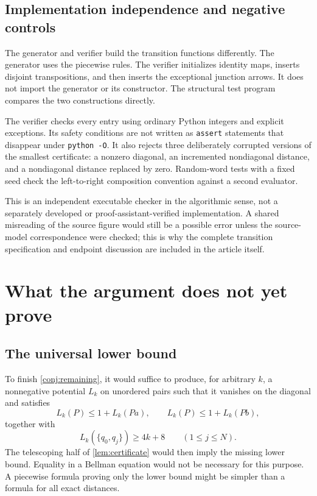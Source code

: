 \documentclass[11pt,a4paper]{article}
\numberwithin{equation}{section}
\theoremstyle{definition}
\theoremstyle{remark}
\begin{document}
\subsection{Implementation independence and negative controls}

The generator and verifier build the transition functions differently.
The generator uses the piecewise rules. The verifier initializes identity
maps, inserts disjoint transpositions, and then inserts the exceptional
junction arrows. It does not import the generator or its constructor.
The structural test program compares the two constructions directly.

The verifier checks every entry using ordinary Python integers and explicit
exceptions. Its safety conditions are not written as \texttt{assert}
statements that disappear under \texttt{python -O}. It also rejects three
deliberately corrupted versions of the smallest certificate: a nonzero
diagonal, an incremented nondiagonal distance, and a nondiagonal distance
replaced by zero. Random-word tests with a fixed seed check the
left-to-right composition convention against a second evaluator.

This is an independent executable checker in the algorithmic sense, not a
separately developed or proof-assistant-verified implementation. A shared
misreading of the source figure would still be a possible error unless the
source-model correspondence were checked; this is why the complete
transition specification and endpoint discussion are included in the
article itself.

\section{What the argument does not yet prove}
\label{sec:remaining}

\subsection{The universal lower bound}

To finish \cref{conj:remaining}, it would suffice to produce, for arbitrary
$k$, a nonnegative potential $L_k$ on unordered pairs such that it vanishes
on the diagonal and satisfies
\begin{equation}\label{eq:potential}
 L_k(P)\leq1+L_k(Pa),\qquad
 L_k(P)\leq1+L_k(Pb),
\end{equation}
together with
\begin{equation}\label{eq:potentialstart}
 L_k(\{q_0,q_j\})\geq4k+8\qquad(1\leq j\leq N).
\end{equation}
The telescoping half of \cref{lem:certificate} would then imply the missing
lower bound. Equality in a Bellman equation would not be necessary for
this purpose. A piecewise formula proving only the lower bound might be
simpler than a formula for all exact distances.
\end{document}
